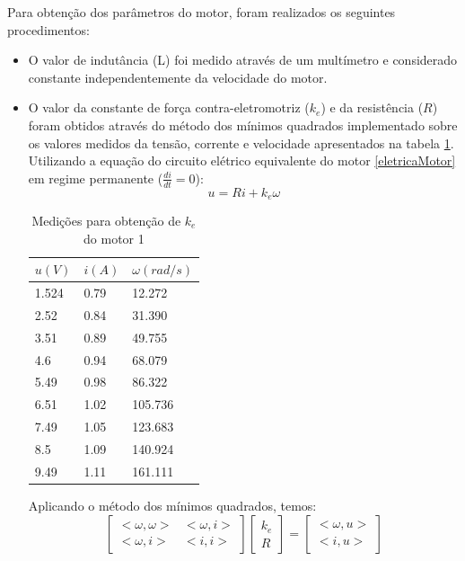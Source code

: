 \documentclass[]{politex}
\begin{document}
Para obtenção dos parâmetros do motor, foram realizados os seguintes procedimentos: 
\begin{itemize}
\item O valor de indutância (L) foi medido através de um multímetro e considerado constante independentemente da velocidade do motor.

\item O valor da constante de força contra-eletromotriz ($k_{e}$) e da resistência ($R$) foram obtidos através do método dos mínimos quadrados implementado sobre os valores medidos da tensão, corrente e velocidade apresentados na tabela \ref{MMQke}. Utilizando a equação do circuito elétrico equivalente do motor \eqref{eletricaMotor} em regime permanente ($\frac{di}{dt} = 0$): 
\begin{equation}
	   u =  R i + k_{e} \omega
\end{equation}

\begin{table}[H]
\centering
\caption{Medições para obtenção de $k_{e}$ do motor 1}
\label{MMQke}
\begin{tabular}{l|l|l}
$u(V)$     & $i(A)$    & $\omega (rad/s)$        \\ \hline
1.524 & 0.79 & 12.272  \\
2.52  & 0.84 & 31.390  \\
3.51  & 0.89 & 49.755  \\
4.6   & 0.94 & 68.079  \\
5.49  & 0.98 & 86.322  \\
6.51  & 1.02 & 105.736 \\
7.49  & 1.05 & 123.683 \\
8.5   & 1.09 & 140.924 \\
9.49  & 1.11 & 161.111
\end{tabular}
\end{table}

Aplicando o método dos mínimos quadrados, temos:
\begin{equation}
\begin{bmatrix}
<\omega, \omega> & <\omega, i>\\
<\omega, i>      & <i, i>
\end{bmatrix}
\begin{bmatrix}
k_{e}\\
R
\end{bmatrix}= 
\begin{bmatrix}
<\omega, u>\\
<i, u>
\end{bmatrix}
\end{equation}


\end{itemize}
\end{document}
